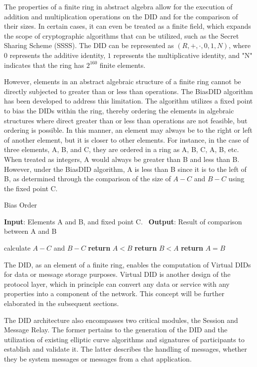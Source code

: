 \documentclass[twocolumn]{article}
\begin{document}
The properties of a finite ring in abstract algebra allow for the execution of addition and multiplication operations on the DID and for the comparison of their sizes. In certain cases, it can even be treated as a finite field, which expands the scope of cryptographic algorithms that can be utilized, such as the Secret Sharing Scheme (SSSS). The DID can be represented as $(R, +, \cdot, 0, 1, N)$, where $0$ represents the additive identity, $1$ represents the multiplicative identity, and "N" indicates that the ring has $2^{160}$ finite elements.

However, elements in an abstract algebraic structure of a finite ring cannot be directly subjected to greater than or less than operations. The BiasDID algorithm has been developed to address this limitation. The algorithm utilizes a fixed point to bias the DIDs within the ring, thereby ordering the elements in algebraic structures where direct greater than or less than operations are not feasible, but ordering is possible. In this manner, an element may always be to the right or left of another element, but it is closer to other elements. For instance, in the case of three elements, A, B, and C, they are ordered in a ring as A, B, C, A, B, etc. When treated as integers, A would always be greater than B and less than B. However, under the BiasDID algorithm, A is less than B since it is to the left of B, as determined through the comparison of the size of $A-C$ and $B-C$ using the fixed point C.


\begin{algorithm}[htpb]
\caption{Bias Order}
\label{alg:biasdid}
\textbf{Input}: Elements A and B, and fixed point C. \
\textbf{Output}: Result of comparison between A and B \
\begin{algorithmic}[1]
\State calculate $A-C$ and $B-C$
\State \textbf{return} $A < B$
\Else
{}
\State \textbf{return} $B < A$
\Else
\State \textbf{return} $A = B$
\EndIf
\EndIf
\end{algorithmic}
\end{algorithm}


The DID, as an element of a finite ring, enables the computation of Virtual DIDs for data or message storage purposes. Virtual DID is another design of the protocol layer, which in principle can convert any data or service with any properties into a component of the network. This concept will be further elaborated in the subsequent sections.


The DID architecture also encompasses two critical modules, the Session and Message Relay. The former pertains to the generation of the DID and the utilization of existing elliptic curve algorithms and signatures of participants to establish and validate it. The latter describes the handling of messages, whether they be system messages or messages from a chat application.
\end{document}
